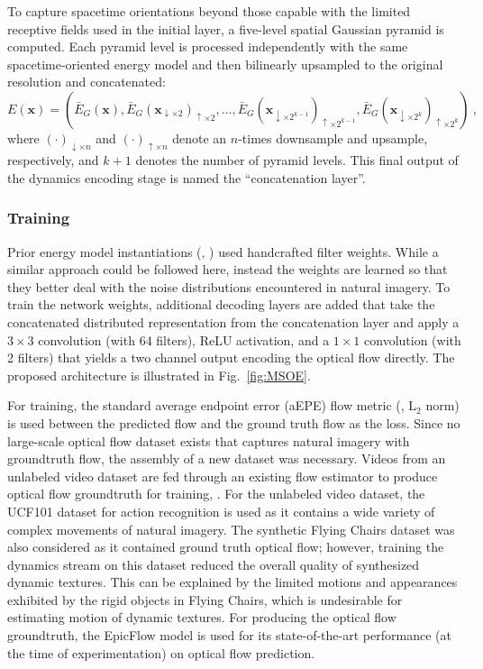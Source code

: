 To capture spacetime orientations beyond those capable
with the limited receptive fields used in the initial
layer, a five-level spatial Gaussian pyramid is computed.
Each pyramid level is processed independently
with the same spacetime-oriented energy model and then
bilinearly upsampled to the original resolution and
concatenated:
\begin{equation}
	E(\mathbf{x}) = \left( \bar{E}_G(\mathbf{x}) , \bar{E}_G(\mathbf{x}_{\downarrow\times2})_{\uparrow\times2} , \dots , \bar{E}_G(\mathbf{x}_{\downarrow\times2^{k-1}})_{\uparrow\times2^{k-1}} , \bar{E}_G(\mathbf{x}_{\downarrow\times2^k})_{\uparrow\times2^k} \right)\ ,
\end{equation}
where $(\cdot)_{\downarrow \times n}$ and $(\cdot)_{\uparrow \times n}$ denote an $n$-times downsample and upsample, respectively, and $k+1$ denotes the number of pyramid levels. This final output of the dynamics encoding stage is named the ``concatenation layer''.

\subsubsection{Training}

Prior energy model instantiations (\eg,
\cite{adelson1985spatiotemporal,derpanis2012spacetime,simoncelli1998})
used handcrafted filter weights.
While a similar approach could be followed here, instead the weights
are learned so that they better deal with the noise distributions encountered in natural imagery.
To train the network weights, additional decoding
layers are added that take the concatenated distributed
representation from the concatenation layer and apply a $3\times 3$ convolution
(with 64 filters), ReLU activation, and a $1\times 1$
convolution (with 2 filters) that yields a two channel
output encoding the optical flow directly.
The proposed architecture is illustrated in
Fig.\ \ref{fig:MSOE}.



For training, the standard average
endpoint error (aEPE) flow metric (\ie, $\text{L}_2$
norm) is used between the predicted flow and the ground truth
flow as the loss.
Since no large-scale optical flow dataset exists that captures
natural imagery with groundtruth flow, the assembly of a new dataset was necessary. Videos
from an unlabeled video dataset are fed through an existing flow
estimator to produce optical
flow groundtruth for training,
\cf \cite{tran2016}.
For the unlabeled video dataset, the UCF101
dataset for action recognition \cite{soomro2012ucf101} is used as it contains a wide variety of complex movements of natural imagery. The synthetic Flying Chairs dataset \cite{dosovitskiy2015} was also considered as it contained ground truth optical flow; however, training the dynamics stream on this dataset reduced the overall quality of synthesized dynamic textures. This can be explained by the limited motions and appearances exhibited by the rigid objects in Flying Chairs, which is undesirable for estimating motion of dynamic textures.
For producing the optical flow groundtruth, the EpicFlow \cite{revaud2015epicflow} model is used for 
its state-of-the-art performance (at the time of experimentation) on optical flow prediction.

